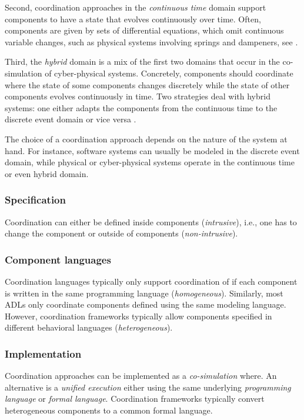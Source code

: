 \documentclass[runningheads]{llncs}
\begin{document}
Second, coordination approaches in the \textit{continuous time} domain support components to have a state that evolves continuously over time.
Often, components are given by sets of differential equations, which omit continuous variable changes, such as physical systems involving springs and dampeners, see \cite{gomesCoSimulationSurvey2019}.

Third, the \textit{hybrid} domain is a mix of the first two domains that occur in the co-simulation of cyber-physical systems.
Concretely, components should coordinate where the state of some components changes discretely while the state of other components evolves continuously in time.
Two strategies deal with hybrid systems: one either adapts the components from the continuous time to the discrete event domain or vice versa \cite{gomesCoSimulationSurvey2019}.

The choice of a coordination approach depends on the nature of the system at hand.
For instance, software systems can usually be modeled in the discrete event domain, while physical or cyber-physical systems operate in the continuous time or even hybrid domain.

\subsubsection{Specification} Coordination can either be defined inside components (\textit{intrusive}), i.e., one has to change the component or outside of components (\textit{non-intrusive}).


\subsubsection{Component languages} Coordination languages typically only support coordination of if each component is written in the same programming language (\textit{homogeneous}).
Similarly, most ADLs only coordinate components defined using the same modeling language.
However, coordination frameworks typically allow components specified in different behavioral languages (\textit{heterogeneous}).


\subsubsection{Implementation} Coordination approaches can be implemented as a \textit{co-simulation} where.
An alternative is a \textit{unified execution} either using the same underlying \textit{programming language} or \textit{formal language}.
Coordination frameworks typically convert heterogeneous components to a common formal language.
\end{document}
